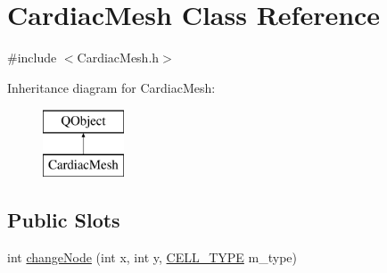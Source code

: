 \hypertarget{class_cardiac_mesh}{\section{Cardiac\+Mesh Class Reference}
\label{class_cardiac_mesh}
}


{\ttfamily \#include $<$Cardiac\+Mesh.\+h$>$}

Inheritance diagram for Cardiac\+Mesh\+:\begin{figure}[H]
\begin{center}
\leavevmode
\includegraphics[height=2.000000cm]{class_cardiac_mesh}
\end{center}
\end{figure}
\subsection*{Public Slots}
\begin{DoxyCompactItemize}
\item 
int \hyperlink{class_cardiac_mesh_a5131c310815bf636bd6de60e61dc7c5e}{change\+Node} (int x, int y, \hyperlink{heart_defines_8h_a2f059cd81f362503874790462d535f5b}{C\+E\+L\+L\+\_\+\+T\+Y\+P\+E} m\+\_\+type)
\end{DoxyCompactItemize}

